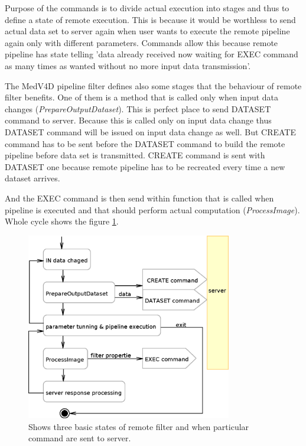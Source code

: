 \par
Purpose of the commands is to divide actual execution into stages and thus to define a state of remote execution.
This is because it would be worthless to send actual data set to server again when user wants to execute the remote pipeline again only with different parameters.
Commands allow this because remote pipeline has state telling 'data already received now waiting for EXEC command as many times as wanted without no more input data transmission'.
\par
The MedV4D pipeline filter defines also some stages that the behaviour of remote filter benefits.
One of them is a method that is called only when input data changes (\mbox{\emph{PrepareOutputDataset}}).
This is perfect place to send DATASET command to server.
Because this is called only on input data change thus DATASET command will be issued on input data change as well.
But CREATE command has to be sent before the DATASET command to build the remote pipeline before data set is transmitted.
CREATE command is sent with DATASET one because remote pipeline has to be recreated every time a new dataset arrives.
\par
And the EXEC command is then send within function that is called when pipeline is executed and that should perform actual computation (\mbox{\emph{ProcessImage}}).
Whole cycle shows the figure \ref{fg:RCClientCycle}.

\begin{figure}
    \centering
    \includegraphics[width=0.8\textwidth]{data/RCClientCycle}
    \caption[Remote MedV4D filter]{Shows three basic states of remote filter and when particular command are sent to server.}
    \label{fg:RCClientCycle}
\end{figure}

